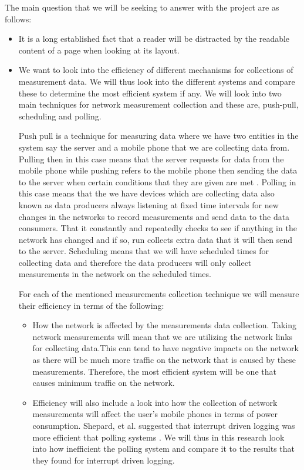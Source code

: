 The main question that we will be seeking to answer with the project are as follows:
\begin{itemize}
	\item It is a long established fact that a reader will be distracted by the readable content of a page when looking at its layout. 
	\item We want to look into the efficiency of different mechanisms for collections of measurement data. We will thus look into the different systems and compare these to determine the most efficient system if any. We will look into two main techniques for network measurement collection and these are, push-pull, scheduling and polling. 
	
	Push pull is a technique for measuring data where we have two entities in the system say the server and a mobile phone that we are collecting data from. Pulling then in this case means that the server requests for data from the mobile phone while pushing refers to the mobile phone then sending the data to the server when certain conditions that they are given are met \cite{article}. Polling in this case means that the we have devices which are collecting data also known as data producers always listening at fixed time intervals for new changes in the networks to record measurements and send data to the data consumers. That it constantly and repeatedly checks to see if anything in the network has changed and if so, run collects extra data that it will then send to the server. Scheduling means that we will have scheduled times for collecting  data and therefore the data producers will only collect measurements in the network on the scheduled times. 
	
	For each of the mentioned measurements collection technique we will measure their efficiency in terms of the following:
	\begin{itemize}
		\item How the network is affected by the measurements data collection. Taking network measurements will mean that we are utilizing the network links for collecting data.This can tend to have negative impacts on the network as there will be much more traffic on the network that is caused by these measurements. Therefore, the most efficient system will be one that causes minimum traffic on the network.
		\item Efficiency will also include a look into how the collection of network measurements will affect the user's mobile phones in terms of power consumption. Shepard, et al. suggested that interrupt driven logging was more efficient that polling systems \cite{Shepard:2011:LMW:1925019.1925023}. We will thus in this research look into how inefficient the polling system and compare it to the results that they found for interrupt driven logging.
	\end{itemize}
\end{itemize}

